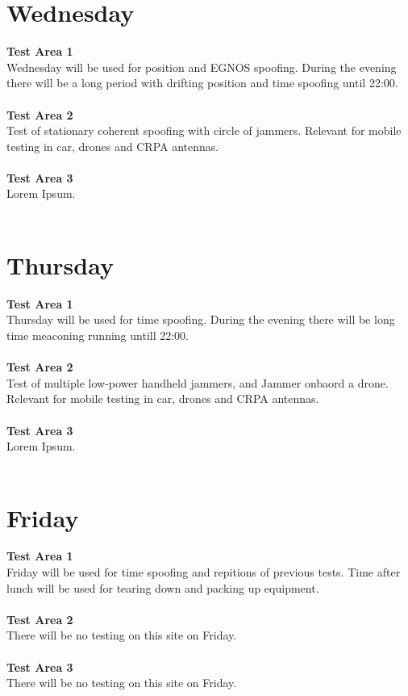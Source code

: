\documentclass[a4paper]{book}
\begin{document}
\begin{landscape}
\chapter{Wednesday}
\Large \textbf{Test Area 1} \\
Wednesday will be used for position and EGNOS spoofing. During the evening there will be a long period with drifting position and time spoofing until 22:00. \\ \\
\Large \textbf{Test Area 2} \\
Test of stationary coherent spoofing with circle of jammers. Relevant for mobile testing in car, drones and CRPA antennas.\\ \\
\Large \textbf{Test Area 3} \\
Lorem Ipsum.\\ \\

%

\chapter{Thursday}
\Large \textbf{Test Area 1} \\
Thursday will be used for time spoofing. During the evening there will be long time meaconing running untill 22:00.\\ \\
\Large \textbf{Test Area 2} \\
Test of multiple low-power handheld jammers, and Jammer onbaord a drone. Relevant for mobile testing in car, drones and CRPA antennas.\\ \\
\Large \textbf{Test Area 3} \\
Lorem Ipsum.\\ \\

%

\chapter{Friday}
\Large \textbf{Test Area 1} \\
Friday will be used for time spoofing and repitions of previous tests. Time after lunch will be used for tearing down and packing up equipment.\\ \\
\Large \textbf{Test Area 2} \\
There will be no testing on this site on Friday.\\ \\
\Large \textbf{Test Area 3} \\
There will be no testing on this site on Friday.\\ \\

%

\end{landscape}
\end{document}
